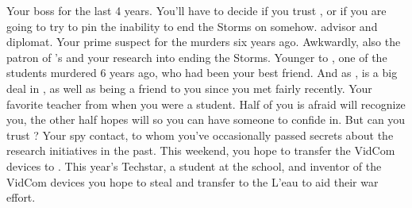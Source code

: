 \documentclass[char]{GL2020}
\begin{document}
\begin{contacts}
	\contact{\cHeadScientist{}} Your boss for the last 4 years. You'll have to decide if you trust \cHeadScientist{}, or if you are going to try to pin the inability to end the Storms on \cHeadScientist{\them} somehow.
	\contact{\cDiplomat{}} \pTech{} advisor and diplomat. Your prime suspect for the murders six years ago. Awkwardly, also the patron of \cHeadScientist{}'s and your research into ending the Storms.
	\contact{\cHeir{}} Younger \cHeir{\sibling} to \cHeirSibling{}, one of the students murdered 6 years ago, who had been your best friend. And as \cHeir{\formal}, \cHeir{} is a big deal in \pTech{}, as well as being a friend to you since you met fairly recently.
	\contact{\cMusic{}} Your favorite teacher from when you were a student. Half of you is afraid \cMusic{\they} will recognize you, the other half hopes \cMusic{\they} will so you can have someone to confide in. But can you trust \cMusic{\them}?
	\contact{\cBunker{}} Your \pShip{} spy contact, to whom you've occasionally passed secrets about the \pTech{} research initiatives in the past. This weekend, you hope to transfer the VidCom devices to \cBunker{}.
	\contact{\cTechStar{}} This year's Techstar, a student at the school, and inventor of the VidCom devices you hope to steal and transfer to the L'eau to aid their war effort.
\end{contacts}
\end{document}
